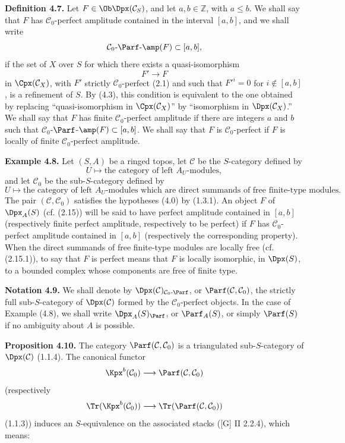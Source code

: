 \textbf{Definition 4.7.} Let \(F\in\Ob\Dpx(\mathcal C_S)\), and let \(a,b\in\mathbb Z\), with \(a\leq b\). We shall say that \(F\) has \(\mathcal C_0\)-perfect amplitude contained in the interval \([a,b]\), and we shall write
\[
  \mathcal C_0\text{-}\Parf\text{-}\amp(F)\subset[a,b],
\]
if the set of \(X\) over \(S\) for which there exists a quasi-isomorphism
\[
  F'\longrightarrow F
\]
in \(\Cpx(\mathcal C_X)\), with \(F'\) strictly \(\mathcal C_0\)-perfect (2.1) and such that \(F'^i=0\) for \(i\notin[a,b]\), is a refinement of \(S\). By (4.3), this condition is equivalent to the one obtained by replacing ``quasi-isomorphism in \(\Cpx(\mathcal C_X)\)'' by ``isomorphism in \(\Dpx(\mathcal C_X)\).'' We shall say that \(F\) has finite \(\mathcal C_0\)-perfect amplitude if there are integers \(a\) and \(b\) such that \(\mathcal C_0\)-\(\Parf\)-\(\amp(F)\subset[a,b]\). We shall say that \(F\) is \(\mathcal C_0\)-perfect if \(F\) is locally of finite \(\mathcal C_0\)-perfect amplitude.

\textbf{Example 4.8.} Let \((S,A)\) be a ringed topos, let \(\mathcal C\) be the \(S\)-category defined by
\[
  U\longmapsto \text{the category of left }A_U\text{-modules},
\]
and let \(\mathcal C_0\) be the sub-\(S\)-category defined by
\[
  U\longmapsto \text{the category of left }A_U\text{-modules which are direct summands of free finite-type modules}.
\]
The pair \((\mathcal C,\mathcal C_0)\) satisfies the hypotheses (4.0) by (1.3.1). An object \(F\) of \(\Dpx_A(S)\) (cf. (2.15)) will be said to have perfect amplitude contained in \([a,b]\) (respectively finite perfect amplitude, respectively to be perfect) if \(F\) has \(\mathcal C_0\)-perfect amplitude contained in \([a,b]\) (respectively the corresponding property). When the direct summands of free finite-type modules are locally free (cf. (2.15.1)), to say that \(F\) is perfect means that \(F\) is locally isomorphic, in \(\Dpx(S)\), to a bounded complex whose components are free of finite type.

\textbf{Notation 4.9.} We shall denote by \(\Dpx(\mathcal C)_{\mathcal C_0\text{-}\Parf}\), or \(\Parf(\mathcal C,\mathcal C_0)\), the strictly full sub-\(S\)-category of \(\Dpx(\mathcal C)\) formed by the \(\mathcal C_0\)-perfect objects. In the case of Example (4.8), we shall write \(\Dpx_A(S)_{\Parf}\), or \(\Parf_A(S)\), or simply \(\Parf(S)\) if no ambiguity about \(A\) is possible.

\textbf{Proposition 4.10.} The category \(\Parf(\mathcal C,\mathcal C_0)\) is a triangulated sub-\(S\)-category of \(\Dpx(\mathcal C)\) (1.1.4). The canonical functor
\[
  \Kpx^b(\mathcal C_0)\longrightarrow \Parf(\mathcal C,\mathcal C_0)
\]
(respectively
\[
  \Tr(\Kpx^b(\mathcal C_0))\longrightarrow \Tr(\Parf(\mathcal C,\mathcal C_0))
\]
(1.1.3)) induces an \(S\)-equivalence on the associated stacks ([G] II 2.2.4), which means:

